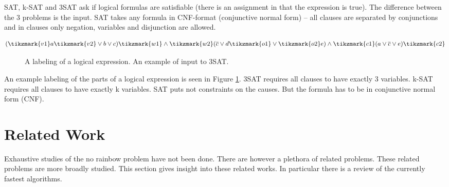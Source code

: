 \documentclass[msc,lith,english]{liuthesis}
\begin{document}
SAT, k-SAT and 3SAT ask if logical formulas are satisfiable (there is an assignment in that the expression is true).
The difference between the 3 problems is the input. SAT takes any formula in
CNF-format (conjunctive normal form) -- all clauses are separated by conjunctions and
in clauses only negation, variables and disjunction are allowed.

$$
  (\tikzmark{v1}a\tikzmark{v2} \vee b \vee c) \tikzmark{w1}\wedge\tikzmark{w2} (\overline{c} \vee d \tikzmark{o1}\vee\tikzmark{o2} e) \wedge \tikzmark{c1}(a \vee \overline{c} \vee e)\tikzmark{c2}
$$
\begin{figure}[h]
  \caption{A labeling of a logical expression. An example of input to 3SAT.}
  \label{figExSAT}
\end{figure}


An example labeling of the  parts of a logical expression is seen in Figure
\ref{figExSAT}. 3SAT requires all clauses to have exactly 3 variables. k-SAT requires all clauses to have exactly k variables. SAT puts not constraints on the causes. But the formula has to be in conjunctive normal form (CNF).




\chapter{Related Work}
Exhaustive studies of the no rainbow problem have not been done. There are however a plethora of related problems.
These related problems are more broadly studied. This section gives insight
into these related works. In particular there is a review of the currently
fastest algorithms.
\end{document}
